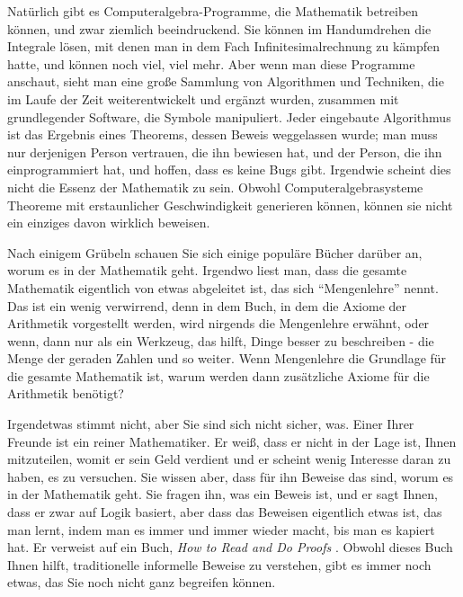 Natürlich gibt es Computeralgebra-Programme, die Mathematik betreiben können, und zwar ziemlich beeindruckend.  Sie können im Handumdrehen die Integrale lösen, mit denen man in dem Fach Infinitesimalrechnung zu kämpfen hatte, und können noch viel, viel mehr.  Aber wenn man diese Programme anschaut, sieht man eine große Sammlung von Algorithmen und Techniken, die im Laufe der Zeit weiterentwickelt und ergänzt wurden, zusammen mit grundlegender Software, die Symbole manipuliert.  Jeder eingebaute Algorithmus ist das Ergebnis eines Theorems, dessen Beweis weggelassen wurde; man muss nur derjenigen Person vertrauen, die ihn bewiesen hat, und der Person, die ihn einprogrammiert hat, und hoffen, dass es keine Bugs gibt. Irgendwie scheint dies nicht die Essenz der Mathematik zu sein.  Obwohl Computeralgebrasysteme Theoreme mit erstaunlicher Geschwindigkeit generieren können, können sie nicht ein einziges davon wirklich beweisen.

Nach einigem Grübeln schauen Sie sich einige populäre Bücher darüber an, worum es in der Mathematik geht.  Irgendwo liest man, dass die gesamte Mathematik eigentlich von etwas abgeleitet ist, das sich "`Mengenlehre"' nennt.  Das ist ein wenig verwirrend, denn in dem Buch, in dem die Axiome der Arithmetik vorgestellt werden, wird nirgends die Mengenlehre erwähnt, oder wenn, dann nur als ein Werkzeug, das hilft, Dinge besser zu beschreiben - die Menge der geraden Zahlen und so weiter.  Wenn Mengenlehre die Grundlage für die gesamte Mathematik ist, warum werden dann zusätzliche Axiome für die Arithmetik benötigt?

Irgendetwas stimmt nicht, aber Sie sind sich nicht sicher, was.  Einer Ihrer Freunde ist ein reiner Mathematiker.  Er weiß, dass er nicht in der Lage ist, Ihnen mitzuteilen, womit er sein Geld verdient und er scheint wenig Interesse daran zu haben, es zu versuchen.  Sie wissen aber, dass für ihn Beweise das sind, worum es in der Mathematik geht. Sie fragen ihn, was ein Beweis ist, und er sagt Ihnen, dass er zwar auf Logik basiert, aber dass das Beweisen eigentlich etwas ist, das man lernt, indem man es immer und immer wieder macht, bis man es kapiert hat.  Er verweist auf ein Buch, {\em How to Read and Do Proofs} \cite{Solow}.  Obwohl dieses Buch Ihnen hilft, traditionelle informelle Beweise zu verstehen, gibt es immer noch etwas, das Sie noch nicht ganz begreifen können.

